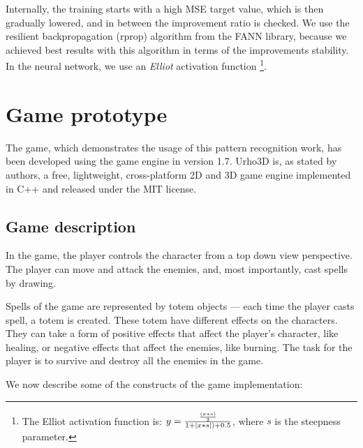 Internally, the training starts with a high MSE target value, which is then gradually lowered, and in between the improvement ratio is checked. We use the resilient backpropagation (rprop) algorithm from the FANN library, because we achieved best results with this algorithm in terms of the improvements stability. In the neural network, we use an \emph{Elliot} activation function \footnote{The Elliot activation function is:
	$y = \frac {\frac{(x*s)}{2}} {1+\left|{x*s}\right|)+ 0.5}$, where $s$ is the steepness parameter.
}.

\section{Game prototype}
The game, which demonstrates the usage of this pattern recognition work, has been developed using the \citet{urho} game engine in version 1.7. Urho3D is, as stated by authors, a free, lightweight, cross-platform 2D and 3D game engine implemented in C++ and released under the MIT license.

\subsection{Game description}
In the game, the player controls the character from a top down view perspective. The player can move and attack the enemies, and, most importantly, cast spells by drawing.

Spells of the game are represented by totem objects --- each time the player casts spell, a totem is created. These totem have different effects on the characters. They can take a form of positive effects that affect the player's character, like healing, or negative effects that affect the enemies, like burning. The task for the player is to survive and destroy all the enemies in the game.

We now describe some of the constructs of the game implementation:

